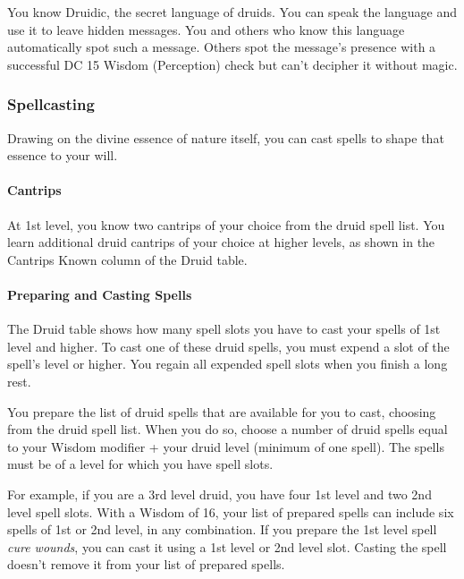 \documentclass[
]{article}
\begin{document}
You know Druidic, the secret language of druids. You can speak the
language and use it to leave hidden messages. You and others who know
this language automatically spot such a message. Others spot the
message's presence with a successful DC 15 Wisdom (Perception) check but
can't decipher it without magic.

\hypertarget{spellcasting}{%
\subsubsection{Spellcasting}\label{spellcasting}}

Drawing on the divine essence of nature itself, you can cast spells to
shape that essence to your will.

\hypertarget{cantrips}{%
\paragraph{Cantrips}\label{cantrips}}

At 1st level, you know two cantrips of your choice from the druid spell
list. You learn additional druid cantrips of your choice at higher
levels, as shown in the Cantrips Known column of the Druid table.

\hypertarget{preparing-and-casting-spells}{%
\paragraph{Preparing and Casting
Spells}\label{preparing-and-casting-spells}}

The Druid table shows how many spell slots you have to cast your spells
of 1st level and higher. To cast one of these druid spells, you must
expend a slot of the spell's level or higher. You regain all expended
spell slots when you finish a long rest.

You prepare the list of druid spells that are available for you to cast,
choosing from the druid spell list. When you do so, choose a number of
druid spells equal to your Wisdom modifier + your druid level (minimum
of one spell). The spells must be of a level for which you have spell
slots.

For example, if you are a 3rd level druid, you have four 1st level and
two 2nd level spell slots. With a Wisdom of 16, your list of prepared
spells can include six spells of 1st or 2nd level, in any combination.
If you prepare the 1st level spell \emph{cure wounds}, you can cast it
using a 1st level or 2nd level slot. Casting the spell doesn't remove it
from your list of prepared spells.
\end{document}
